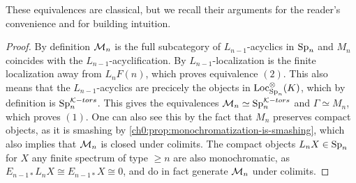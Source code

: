 These equivalences are classical, but we recall their arguments for the reader's convenience and for building intuition. 

\begin{proof}
    By definition $\mathcal{M}_{n}$ is the full subcategory of $L_{n-1}$-acyclics in $\mathrm{Sp}_{n}$ and $M_n$ coincides with the $L_{n-1}$-acyclification. By \cite[6.10]{hovey-strickland_99} $L_{n-1}$-localization is the finite localization away from $L_nF(n)$, which proves equivalence $(2)$. This also means that the $L_{n-1}$-acyclics are precicely the objects in $\operatorname{Loc}^\otimes_{\mathrm{Sp}_{n}}(K)$, which by definition is $\mathrm{Sp}_{n}^{\mathcal{K}-tors}$. This gives the equivalences $\mathcal{M}_{n} \simeq \mathrm{Sp}_{n}^{\mathcal{K}-tors}$ and $\Gamma \simeq M_n$, which proves $(1)$. One can also see this by the fact that $M_n$ preserves compact objects, as it is smashing by \cref{ch0:prop:monochromatization-is-smashing}, which also implies that $\mathcal{M}_{n}$ is closed under colimits. The compact objects $L_n X\in \mathrm{Sp}_{n}$ for $X$ any finite spectrum of type $\geq n$ are also monochromatic, as $E_{n-1 *} L_n X \cong E_{n-1 *}X\cong 0$, and do in fact generate $\mathcal{M}_{n}$ under colimits. 



    
    


\end{proof}
